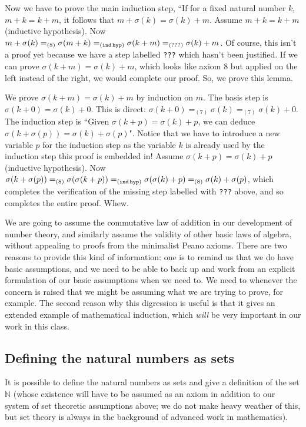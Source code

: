 \documentclass[12pt]{article}
\begin{document}
Now we have to prove the main induction step, ``If for a fixed natural number $k$, $m+k=k+m$, it follows that $m+\sigma(k) = \sigma(k)+m$.  Assume $m+k=k+m$ (inductive hypothesis).  Now $m+\sigma(k) =_{(8)} \sigma(m+k) = _{({\tt ind\, hyp})} \sigma(k+m) = _{({\tt ???})} \sigma(k) +m$.  Of course, this isn't a proof yet because we have a step labelled {\tt ???} which hasn't been justified.  If we can prove $\sigma(k+m) = \sigma(k)+m$, which looks like axiom 8 but applied on the left instead of the right, we would complete our proof.  So, we prove this lemma.

We prove $\sigma(k+m) = \sigma(k)+m$ by induction on $m$.  The basis step is $\sigma(k+0) = \sigma(k)+0$.  This is direct:
$\sigma(k+0) =_{(7)} \sigma(k) =_{(7)} \sigma(k)+0$.   The induction step is ``Given $\sigma(k+p) = \sigma(k)+p$,
we can deduce $\sigma(k+\sigma(p)) = \sigma(k)+\sigma(p)$".  Notice that we have to introduce a new variable $p$ for the induction step as the variable $k$ is already used by the induction step this proof is embedded in!  Assume $\sigma(k+p) = \sigma(k)+p$ (inductive hypothesis).  Now $\sigma(k+\sigma(p)) =_{(8)} \sigma(\sigma(k+p)) =_{({\tt ind\,hyp})} \sigma(\sigma(k)+p) =_{(8)} \sigma(k)+\sigma(p)$, which completes the verification of the missing step labelled with {\tt ???} above, and so completes the entire proof.  Whew.

We are going to assume the commutative law of addition in our development of number theory, and similarly assume the validity of other basic laws of algebra, without appealing to proofs from the minimalist Peano axioms.  There are two reasons to provide this kind of information:  one is to remind us that we do have basic assumptions, and we need to be able to back up and work from an explicit formulation of our basic assumptions when we need to.  We need to whenever the concern is raised that we might be assuming what we are trying to prove, for example.  The second reason why this digression is useful is that it gives an extended example of mathematical induction, which {\em will\/} be very important in our work in this class.

\subsection{Defining the natural numbers as sets}

It is possible to define the natural numbers as sets and give a definition of the set $\mathbb N$ (whose existence will have to be assumed as an axiom in addition to our system of set theoretic assumptions above;  we do not make heavy weather of this, but set theory is always in the background of advanced work in mathematics).
\end{document}

